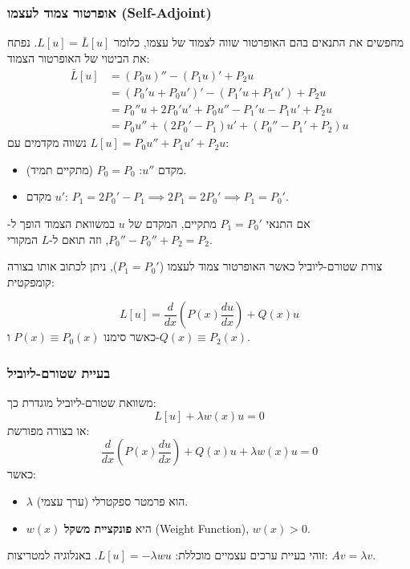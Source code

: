      \subsubsection*{אופרטור צמוד לעצמו (Self-Adjoint)}
מחפשים את התנאים בהם האופרטור שווה לצמוד של עצמו, כלומר $L[u] = \bar{L}[u]$. נפתח את הביטוי של האופרטור הצמוד:
\begin{align*}
\bar{L}[u] &= (P_0 u)'' - (P_1 u)' + P_2 u \\
&= (P_0' u + P_0 u')' - (P_1' u + P_1 u') + P_2 u \\
&= P_0'' u + 2P_0' u' + P_0 u'' - P_1' u - P_1 u' + P_2 u \\
&= P_0 u'' + (2P_0' - P_1)u' + (P_0'' - P_1' + P_2)u
\end{align*}
נשווה מקדמים עם $L[u] = P_{0} u'' + P_{1} u' + P_{2} u$:
\begin{itemize}
\item מקדם $u''$: $P_{0} = P_{0}$ (מתקיים תמיד).
\item מקדם $u'$: $P_{1} = 2P_{0}' - P_{1} \implies 2P_{1} = 2P_{0}' \implies \boxed{P_1 = P_0'}$.
\end{itemize}
    אם התנאי $P_{1} = P_{0}'$ מתקיים, המקדם של $u$ במשוואת הצמוד הופך ל- $P_{0}''
    - P_{0}'' + P_{2} = P_{2}$, וזה תואם ל-$L$ המקורי.
    \begin{resultbox}
        {צורת שטורם-ליוביל} כאשר האופרטור צמוד לעצמו ($P_{1} = P_{0}'$), ניתן
        לכתוב אותו בצורה קומפקטית:

        \[
            L[u] = \frac{d}{dx}\left(P(x)\frac{du}{dx}\right) + Q(x)u
        \]כאשר סימנו $P(x) \equiv P_{0}(x)$ ו-$Q(x) \equiv P_{2}(x)$.
    \end{resultbox}
\subsubsection*{בעיית שטורם-ליוביל}
משוואת שטורם-ליוביל מוגדרת כך:
\[
    L[u] + \lambda w(x) u = 0
\]
או בצורה מפורשת:
\[
    \boxed{\frac{d}{dx}\left(P(x)\frac{du}{dx}\right) + Q(x)u + \lambda w(x)u = 0}
\]
כאשר:
\begin{itemize}
    \item $\lambda$ הוא פרמטר ספקטרלי (ערך עצמי).
    \item $w(x)$ היא \textbf{פונקציית משקל} (Weight Function), $w(x) > 0$.
\end{itemize}
זוהי בעיית ערכים עצמיים מוכללת: $L[u] = -\lambda w u$. באנלוגיה למטריצות: $Av = \lambda v$.  

